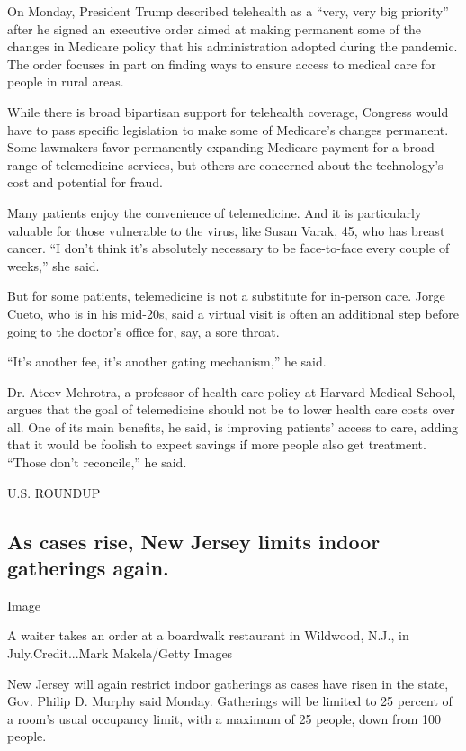 On Monday, President Trump described telehealth as a ``very, very big
priority'' after he signed an executive order aimed at making permanent
some of the changes in Medicare policy that his administration adopted
during the pandemic. The order focuses in part on finding ways to ensure
access to medical care for people in rural areas.

While there is broad bipartisan support for telehealth coverage,
Congress would have to pass specific legislation to make some of
Medicare's changes permanent. Some lawmakers favor permanently expanding
Medicare payment for a broad range of telemedicine services, but others
are concerned about the technology's cost and potential for fraud.

Many patients enjoy the convenience of telemedicine. And it is
particularly valuable for those vulnerable to the virus, like Susan
Varak, 45, who has breast cancer. ``I don't think it's absolutely
necessary to be face-to-face every couple of weeks,'' she said.

But for some patients, telemedicine is not a substitute for in-person
care. Jorge Cueto, who is in his mid-20s, said a virtual visit is often
an additional step before going to the doctor's office for, say, a sore
throat.

``It's another fee, it's another gating mechanism,'' he said.

Dr. Ateev Mehrotra, a professor of health care policy at Harvard Medical
School, argues that the goal of telemedicine should not be to lower
health care costs over all. One of its main benefits, he said, is
improving patients' access to care, adding that it would be foolish to
expect savings if more people also get treatment. ``Those don't
reconcile,'' he said.

U.S. ROUNDUP

\hypertarget{as-cases-rise-new-jersey-limits-indoor-gatherings-again}{%
\subsection{As cases rise, New Jersey limits indoor gatherings
again.}\label{as-cases-rise-new-jersey-limits-indoor-gatherings-again}}

Image

A waiter takes an order at a boardwalk restaurant in Wildwood, N.J., in
July.Credit...Mark Makela/Getty Images

New Jersey will again restrict indoor gatherings as cases have risen in
the state, Gov. Philip D. Murphy said Monday. Gatherings will be limited
to 25 percent of a room's usual occupancy limit, with a maximum of 25
people, down from 100 people.

